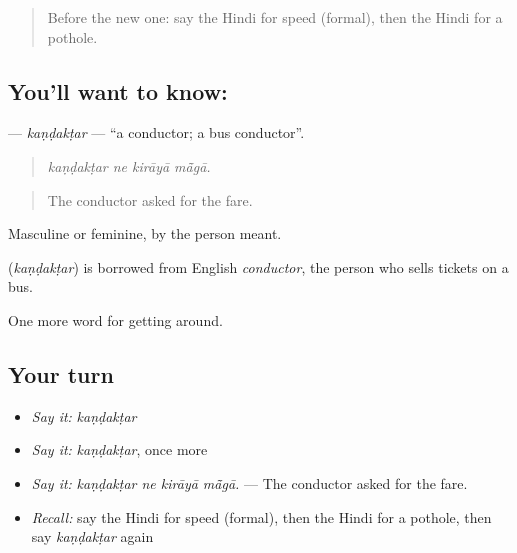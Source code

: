 \label{lesson:HI-C405-kandaktar}



\begin{quote}
Before the new one: say the Hindi for speed (formal), then the Hindi for a pothole.
\end{quote}

\subsection*{You'll want to know: }
\textbf{} — \emph{kaṇḍakṭar} — \textquotedblleft{}a conductor; a bus conductor\textquotedblright{}.

\begin{quote}
   
\end{quote}

\begin{quote}
\emph{kaṇḍakṭar ne kirāyā mā̃gā.}
\end{quote}

\begin{quote}
The conductor asked for the fare.
\end{quote}

Masculine or feminine, by the person meant.

\begin{cousinweb}
\textbf{} (\emph{kaṇḍakṭar}) is borrowed from English \emph{conductor}, the person who sells tickets on a bus.
\end{cousinweb}

\begin{grammarlens}[title={What you've built}]
One more word for getting around.
\end{grammarlens}

\subsection*{Your turn}
\begin{itemize}
\raggedright
  \item \emph{Say it:} \emph{kaṇḍakṭar}
  \item \emph{Say it:} \emph{kaṇḍakṭar}, once more
  \item \emph{Say it:} \emph{kaṇḍakṭar ne kirāyā mā̃gā.} — The conductor asked for the fare.
  \item \emph{Recall:} say the Hindi for speed (formal), then the Hindi for a pothole, then say \emph{kaṇḍakṭar} again
\end{itemize}

